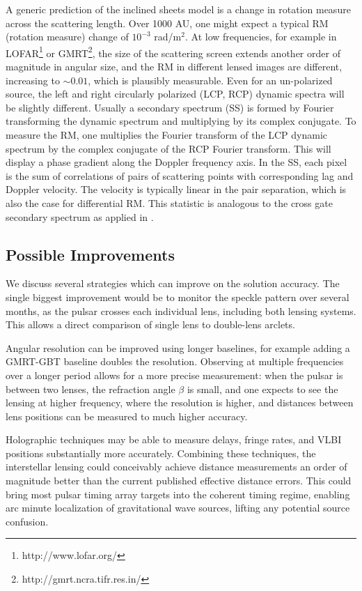 \documentclass[useAMS,usenatbib]{mn2e}
\begin{document}
A generic prediction of the inclined sheets model is a change in rotation
measure across the scattering length.  Over 1000 AU, one might expect
a typical RM (rotation measure) change of $10^{-3}$ rad/m$^2$.  At low frequencies, for
example in LOFAR\footnote{http://www.lofar.org/} or GMRT\footnote{http://gmrt.ncra.tifr.res.in/}, the size of the scattering screen extends
another order of magnitude in angular size, and the RM in different
lensed images are different, increasing to 
$\sim 0.01$, which is plausibly measurable.  Even for an un-polarized
source, the left and right circularly polarized (LCP, RCP) dynamic spectra will
be slightly different.  Usually a secondary spectrum (SS) is formed by
Fourier transforming the dynamic spectrum and multiplying by its
complex conjugate.  To measure the RM, one multiplies the Fourier
transform of the LCP dynamic spectrum by the complex conjugate of the
RCP Fourier transform.  This will display a phase gradient along the Doppler
frequency axis.  In the SS, each pixel is the sum of correlations of
pairs of scattering points with corresponding lag and Doppler
velocity.  The velocity is typically linear in the pair separation,
which is also the case for differential RM.   This statistic is
analogous to the cross gate secondary spectrum as applied in
\citet{2014MNRAS.440L..36P}. 

\subsection{Possible Improvements}

We discuss several strategies which can improve on the solution
accuracy.  The single biggest improvement would be to monitor the speckle pattern over
several months, as the pulsar crosses each individual lens,
including both lensing systems.  This allows a direct comparison of
single lens to double-lens arclets.

Angular resolution can be improved using longer baselines, for example
adding a GMRT-GBT baseline doubles the resolution.  Observing at
multiple frequencies over a longer period allows for a more precise
measurement: when the pulsar is between two lenses, the refraction
angle $\beta$ is small, and one expects to see the lensing at higher
frequency, where the resolution is higher, and distances between
lens positions can be measured to much higher accuracy.

Holographic techniques \citep{2008MNRAS.388.1214W,2014MNRAS.440L..36P}
may be able to measure delays, fringe rates, and VLBI positions
substantially more accurately.  Combining these techniques, the
interstellar lensing could conceivably achieve distance measurements
an order of magnitude better than the current published effective
distance errors.  This could bring most pulsar timing array targets
into the coherent timing regime, enabling arc minute localization of
gravitational wave sources, lifting any potential source confusion.
\end{document}
